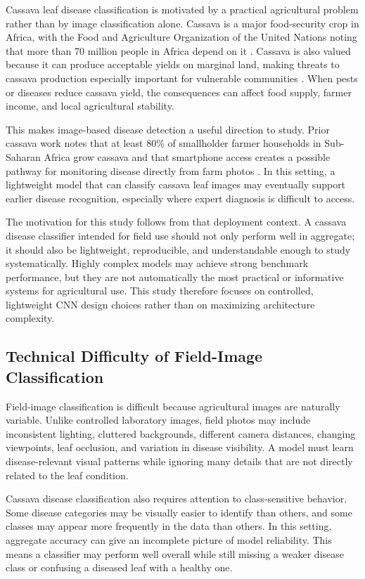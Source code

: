 \documentclass[11pt]{article}
\begin{document}
Cassava leaf disease classification is motivated by a practical agricultural problem rather than by image classification alone. Cassava is a major food-security crop in Africa, with the Food and Agriculture Organization of the United Nations noting that more than 70 million people in Africa depend on it \cite{faoCassavaImportance}. Cassava is also valued because it can produce acceptable yields on marginal land, making threats to cassava production especially important for vulnerable communities \cite{faoCassavaImportance}. When pests or diseases reduce cassava yield, the consequences can affect food supply, farmer income, and local agricultural stability.

This makes image-based disease detection a useful direction to study. Prior cassava work notes that at least 80\% of smallholder farmer households in Sub-Saharan Africa grow cassava and that smartphone access creates a possible pathway for monitoring disease directly from farm photos \cite{mwebaze2019}. In this setting, a lightweight model that can classify cassava leaf images may eventually support earlier disease recognition, especially where expert diagnosis is difficult to access.

The motivation for this study follows from that deployment context. A cassava disease classifier intended for field use should not only perform well in aggregate; it should also be lightweight, reproducible, and understandable enough to study systematically. Highly complex models may achieve strong benchmark performance, but they are not automatically the most practical or informative systems for agricultural use. This study therefore focuses on controlled, lightweight CNN design choices rather than on maximizing architecture complexity.

\subsection{Technical Difficulty of Field-Image Classification}

Field-image classification is difficult because agricultural images are naturally variable. Unlike controlled laboratory images, field photos may include inconsistent lighting, cluttered backgrounds, different camera distances, changing viewpoints, leaf occlusion, and variation in disease visibility. A model must learn disease-relevant visual patterns while ignoring many details that are not directly related to the leaf condition.

Cassava disease classification also requires attention to class-sensitive behavior. Some disease categories may be visually easier to identify than others, and some classes may appear more frequently in the data than others. In this setting, aggregate accuracy can give an incomplete picture of model reliability. This means a classifier may perform well overall while still missing a weaker disease class or confusing a diseased leaf with a healthy one.
\end{document}
